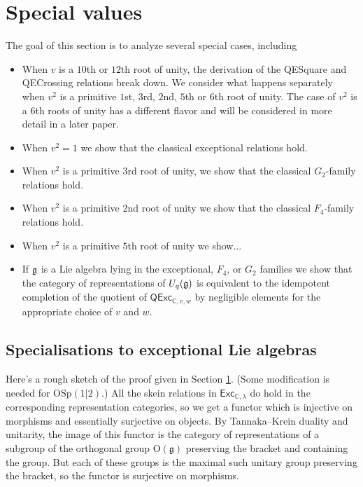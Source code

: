 \documentclass[12pt]{amsart}
\begin{document}
\section{Special values}
\label{sec:special-values}

The goal of this section is to analyze several special cases,
including
\begin{itemize}
\item When $v$ is a $10$th or $12$th root of unity, the
  derivation of the QESquare and QECrossing relations break down.  We consider
  what happens separately when $v^2$ is a primitive $1$st, $3$rd, $2$nd, $5$th or $6$th
  root of unity.  The case of $v^2$ is a $6$th roots of unity has a different flavor and will be 
  considered in more detail in a later paper.
\item When $v^2=1$ we show that the classical exceptional relations hold.
\item When $v^2$ is a primitive $3$rd root of unity, we show that the classical $G_2$-family relations hold.
\item When $v^2$ is a primitive $2$nd root of unity we show that the classical $F_4$-family relations hold.
\item When $v^2$ is a primitive $5$th root of unity we show...
\item If ${\mathfrak g}$ is a Lie algebra lying in the exceptional, $F_4$, or $G_2$ families we show that the category of representations of $U_q({\mathfrak g})$ is equivalent to the idempotent completion of the quotient of $\mathsf{QExc}_{\mathbb{C},v,w}$ by negligible elements for the appropriate choice of $v$ and $w$.
\end{itemize}



\subsection{Specialisations to exceptional Lie algebras}%

Here's a rough sketch of the proof given in Section \ref{sec:special-values}.
(Some modification is
needed for $\mathrm{OSp}(1|2)$.)  All the skein relations in
$\mathsf{Exc}_{\mathbb{C},\lambda}$ do hold in the corresponding
representation categories, so we get a functor which is injective on morphisms
and essentially surjective on objects.  By Tannaka--Krein duality and
unitarity, the image of this functor is the category of representations of a
subgroup of the orthogonal group $\mathrm{O}(\mathfrak{g})$ preserving the bracket and containing
the group.  But each of these groups is the maximal such unitary group
preserving the bracket, so the functor is surjective on morphisms.
\end{document}
